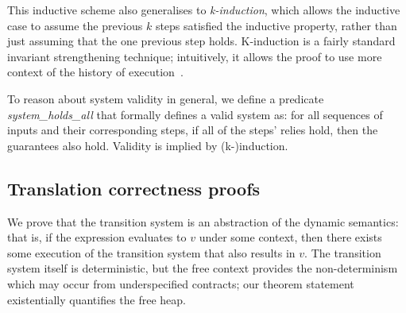 \documentclass[a4paper,UKenglish,cleveref, autoref, thm-restate,anonymous]{lipics-v2021}
\begin{document}
This inductive scheme also generalises to \emph{k-induction}, which allows the inductive case to assume the previous $k$ steps satisfied the inductive property, rather than just assuming that the one previous step holds.
K-induction is a fairly standard invariant strengthening technique; intuitively, it allows the proof to use more context of the history of execution~\cite{hagen2008scaling,champion2016kind2,gacek2018jkind}.

To reason about system validity in general, we define a predicate \emph{system_holds_all} that formally defines a valid system as: for all sequences of inputs and their corresponding steps, if all of the steps' relies hold, then the guarantees also hold.
Validity is implied by (k-)induction.

\subsection{Translation correctness proofs}
\label{s:transition:proof}

We prove that the transition system is an abstraction of the dynamic semantics: that is, if the expression evaluates to $v$ under some context, then there exists some execution of the transition system that also results in $v$.
The transition system itself is deterministic, but the free context provides the non-determinism which may occur from underspecified contracts; our theorem statement existentially quantifies the free heap.
\end{document}

